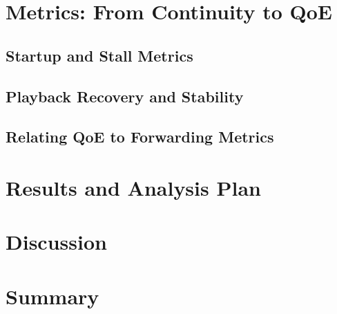 \section{Metrics: From Continuity to QoE}
\subsection{Startup and Stall Metrics}
\subsection{Playback Recovery and Stability}
\subsection{Relating QoE to Forwarding Metrics}

\section{Results and Analysis Plan}

\section{Discussion}

\section{Summary}